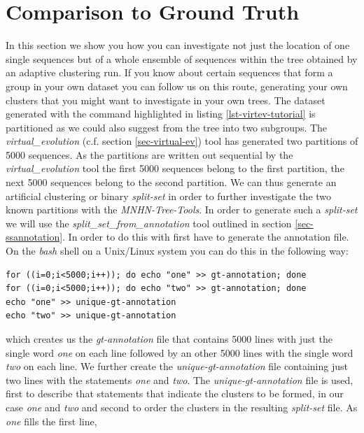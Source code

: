 \section{Comparison to Ground Truth}

In this section we show you how you can investigate not just the location
of one single sequences but of a whole ensemble of sequences within the tree
obtained by an adaptive clustering run. If you know about certain
sequences that form a group in your own dataset you can follow us on
this route, generating your own clusters that you might want to
investigate in your own trees. The dataset generated with the command
highlighted in listing \ref{lst-virtev-tutorial} is partitioned as we
could also suggest from the tree into two subgroups. The
\emph{virtual\_evolution} (c.f. section \ref{sec-virtual-ev}) tool has
generated two partitions of 5000 sequences. As the partitions are
written out sequential by the \emph{virtual\_evolution} tool the
first 5000 sequences belong to the first partition, the next 5000
sequences belong to the second partition. We can thus generate an
artificial clustering or binary \emph{split-set} in order to further
investigate the two known partitions with the \emph{MNHN-Tree-Tools}. In
order to generate such a \emph{split-set} we will use the
\emph{split\_set\_from\_annotation} tool outlined in section
\ref{sec-ssannotation}. In order to do this with first have to
generate the annotation file. On the \emph{bash} \cite{bash} shell on
a Unix/Linux system you can do this in the following way:
\begin{lstlisting}
for ((i=0;i<5000;i++)); do echo "one" >> gt-annotation; done
for ((i=0;i<5000;i++)); do echo "two" >> gt-annotation; done
echo "one" >> unique-gt-annotation
echo "two" >> unique-gt-annotation
\end{lstlisting}
which creates us the \emph{gt-annotation} file that contains 5000
lines with just the single word \emph{one} on each line followed by an
other 5000 lines with the single word \emph{two} on each line. We
further create the \emph{unique-gt-annotation} file containing just
two lines with the statements \emph{one} and \emph{two}. The
\emph{unique-gt-annotation} file is used, first to describe that
statements that indicate the clusters to be formed, in our case
\emph{one} and \emph{two} and second to order the clusters in the
resulting \emph{split-set} file. As \emph{one} fills the first line,
